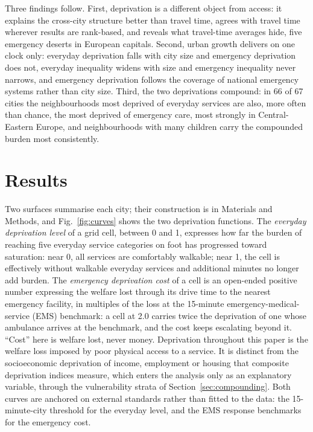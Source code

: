 \documentclass[11pt]{article}
\begin{document}
Three findings follow. First, deprivation is a different object from
access: it explains the cross-city structure better than travel time,
agrees with travel time wherever results are rank-based, and reveals what
travel-time averages hide, five emergency deserts in European capitals.
Second, urban growth delivers on one clock only: everyday deprivation falls
with city size and emergency deprivation does not, everyday inequality
widens with size and emergency inequality never narrows, and emergency
deprivation follows the coverage of national emergency systems rather than
city size. Third, the two deprivations compound: in 66 of 67 cities the
neighbourhoods most deprived of everyday services are also, more often
than chance, the most deprived of emergency care, most strongly in
Central-Eastern Europe, and neighbourhoods with many children carry the
compounded burden most consistently.

\section{Results}\label{sec:results}

Two surfaces summarise each city; their construction is in Materials and
Methods, and Fig.~\ref{fig:curves} shows the two deprivation functions.
The \emph{everyday deprivation level} of a grid cell, between 0 and 1,
expresses how far the burden of reaching five everyday service categories
on foot has progressed toward saturation: near 0, all services are
comfortably walkable; near 1, the cell is effectively without walkable
everyday services and additional minutes no longer add burden. The
\emph{emergency deprivation cost} of a cell is an open-ended positive
number expressing the welfare lost through its drive time to the nearest
emergency facility, in multiples of the loss at the 15-minute
emergency-medical-service (EMS) benchmark: a cell at 2.0 carries twice the
deprivation of one whose ambulance arrives at the benchmark, and the cost
keeps escalating beyond it. ``Cost'' here is welfare lost, never money.
Deprivation throughout this paper is the welfare loss imposed by poor
physical access to a service. It is distinct from the socioeconomic
deprivation of income, employment or housing that composite deprivation
indices measure, which enters the analysis only as an explanatory
variable, through the vulnerability strata of
Section~\ref{sec:compounding}.
Both curves are anchored on external standards rather than fitted to the
data: the 15-minute-city threshold for the everyday level, and the EMS
response benchmarks for the emergency cost.
\end{document}
